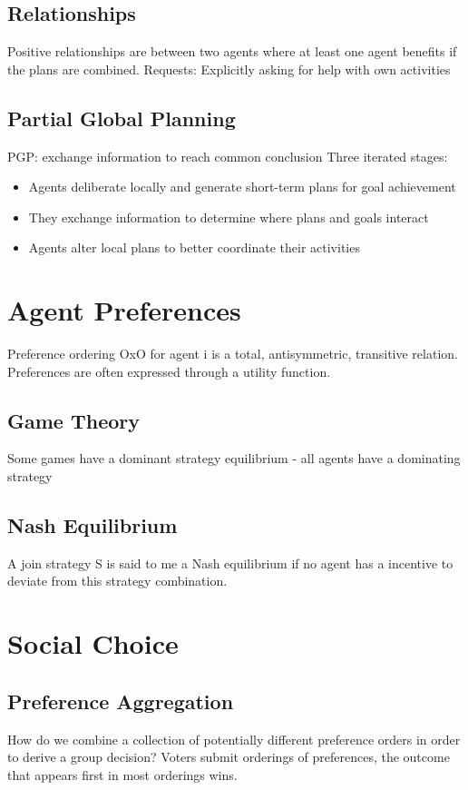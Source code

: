 \documentclass{article}
\begin{document}
\subsection{Relationships}
Positive relationships are between two agents where at least one agent benefits if the plans are combined.
Requests: Explicitly asking for help with own activities

\subsection{Partial Global Planning}
PGP: exchange information to reach common conclusion
Three iterated stages:
\begin{itemize}
    \item Agents deliberate locally and generate short-term plans for goal achievement
    \item They exchange information to determine where plans and goals interact
    \item Agents alter local plans to better coordinate their activities   
\end{itemize}

\section{Agent Preferences}
Preference ordering OxO for agent i is a total, antisymmetric, transitive relation.
Preferences are often expressed through a utility function.
\subsection{Game Theory}
Some games have a dominant strategy equilibrium - all agents have a dominating strategy

\subsection{Nash Equilibrium}
A join strategy S is said to me a Nash equilibrium if no agent has a incentive to deviate from this strategy combination.

\section{Social Choice}
\subsection{Preference Aggregation}
How do we combine a collection of potentially different preference orders in order to derive a group decision?
Voters submit orderings of preferences, the outcome that appears first in most orderings wins.
\end{document}
